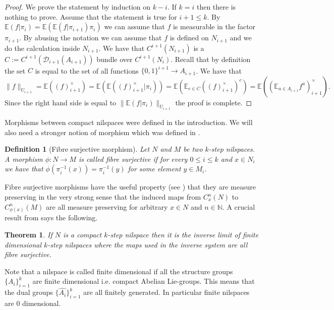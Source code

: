 \documentclass [11pt] {article}
\newtheorem{theorem}{Theorem}
\newtheorem{definition}{Definition}[section]
\begin{document}
\begin{proof} We prove the statement by induction on $k-i$. If $k=i$ then there is nothing to prove. Assume that the statement is true for $i+1\leq k$. By $\mathbb{E}(f|\pi_i)=\mathbb{E}(\mathbb{E}(f|\pi_{i+1})\pi_i)$ we can assume that $f$ is measurable in the factor $\pi_{i+1}$. By abusing the notation we can assume that $f$ is defined on $N_{i+1}$ and we do the calculation inside $N_{i+1}$. We have that $C^{i+1}(N_{i+1})$ is a $C:=C^{i+1}(\mathcal{D}_{i+1}(A_{i+1}))$ bundle over $C^{i+1}(N_i)$. Recall that by definition the set $C$ is equal to the set of all functions $\{0,1\}^{i+1}\rightarrow A_{i+1}$. We have that $$\|f\|_{U_{i+1}}=\mathbb{E}((f)_{i+1}^\times)=\mathbb{E}(\mathbb{E}((f)_{i+1}^\times|\pi_i))=\mathbb{E}(\mathbb{E}_{c\in C}((f)_{i+1}^\times)^c)=\mathbb{E}((\mathbb{E}_{a\in A_{i+1}}f^a)_{i+1}^\times).$$ Since the right hand side is equal to $\|\mathbb{E}(f|\pi_i)\|_{U_{i+1}}$ the proof is complete.
\end{proof}

\medskip

Morphisms between compact nilspaces were defined in the introduction. We will also need a stronger notion of morphism which was defined in \cite{NP}.

\begin{definition}[Fibre surjective morphism] Let $N$ and $M$ be two $k$-step nilspaces. A morphism $\phi:N\rightarrow M$ is called fibre surjective if for every $0\leq i\leq k$ and $x\in N_i$ we have that $\phi(\pi_i^{-1}(x))=\pi_i^{-1}(y)$ for some element $y\in M_i$.  
\end{definition}

Fibre surjective morphisms have the useful property (see \cite{NP}) that they are measure preserving in the very strong sense that the induced maps from $C^n_x(N)$ to $C^n_{\phi(x)}(M)$ are all measure preserving for arbitrary $x\in N$ and $n\in\mathbb{N}$. A crucial result from \cite{NP} says the following.

\begin{theorem}\label{inverselimit} If $N$ is a compact $k$-step nilspace then it is the inverse limit of finite dimensional $k$-step nilspaces where the maps used in the inverse system are all fibre surjective.
\end{theorem} 

Note that a nilspace is called finite dimensional if all the structure groups $\{A_i\}_{i=1}^k$ are finite dimensional i.e. compact Abelian Lie-groups. This means that the dual groups $\{\hat{A_i}\}_{i=1}^k$ are all finitely generated. In particular finite nilspaces are $0$ dimensional.
\end{document}
